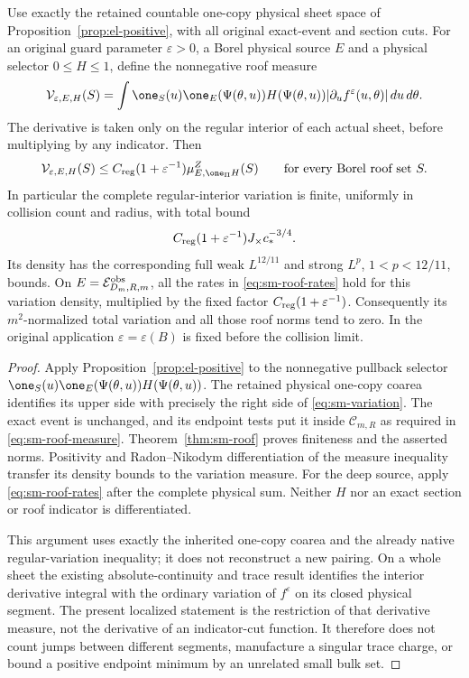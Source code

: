 \begin{corollary}
\label{cor:sm-variation}
Use exactly the retained countable one-copy physical sheet space of
Proposition~\ref{prop:el-positive}, with all original exact-event
and section cuts.  For an original guard parameter $\varepsilon>0$,
a Borel physical source $E$ and a physical selector $0\le H\le1$,
define the nonnegative roof measure
\[
 \mathcal V_{\varepsilon,E,H}(S)
  =\int\one_S(u)\one_E(\Psi(\theta,u))H(\Psi(\theta,u))
          |\partial_u f^\varepsilon(u,\theta)|\,du\,d\theta.
\]
The derivative is taken only on the regular interior of each actual
sheet, before multiplying by any indicator.  Then
\begin{equation}\label{eq:sm-variation}
 \mathcal V_{\varepsilon,E,H}(S)
 \le C_{\rm reg}(1+\varepsilon^{-1})
                       \mu^Z_{E,\one_\Pi H}(S)
 \qquad\hbox{for every Borel roof set }S.
\end{equation}
In particular the complete regular-interior variation is finite,
uniformly in collision count and radius, with total bound
\[
 C_{\rm reg}(1+\varepsilon^{-1})J_\times c_*^{-3/4}.
\]
Its density has the corresponding full weak $L^{12/11}$ and
strong $L^p$, $1<p<12/11$, bounds.  On
$E=\mathcal E^{\rm obs}_{D_m,R,m}$, all the rates in
\eqref{eq:sm-roof-rates} hold for this variation density, multiplied
by the fixed factor $C_{\rm reg}(1+\varepsilon^{-1})$.
Consequently its $m^2$-normalized total variation and all those
roof norms tend to zero.  In the original application
$\varepsilon=\varepsilon(B)$ is fixed before the collision limit.
\end{corollary}
\begin{proof}
Apply Proposition~\ref{prop:el-positive} to the nonnegative
pullback selector
$\one_S(u)\one_E(\Psi(\theta,u))H(\Psi(\theta,u))$.
The retained physical one-copy coarea identifies its upper side
with precisely the right side of \eqref{eq:sm-variation}.
The exact event is unchanged, and its endpoint tests put it inside
$\mathcal C_{m,R}$ as required in \eqref{eq:sm-roof-measure}.
Theorem~\ref{thm:sm-roof} proves finiteness and the asserted
norms.  Positivity and Radon--Nikodym differentiation of the
measure inequality transfer its density bounds to the variation
measure.  For the deep source, apply \eqref{eq:sm-roof-rates}
after the complete physical sum.  Neither $H$ nor an exact
section or roof indicator is differentiated.

This argument uses exactly the inherited one-copy coarea and the
already native regular-variation inequality; it does not reconstruct
a new pairing.  On a whole sheet the existing absolute-continuity
and trace result identifies the interior derivative integral with
the ordinary variation of $f^\varepsilon$ on its closed physical
segment.  The present localized statement is the restriction of
that derivative measure, not the derivative of an indicator-cut
function.  It therefore does not count jumps between different
segments, manufacture a singular trace charge, or bound a positive
endpoint minimum by an unrelated small bulk set.
\end{proof}

